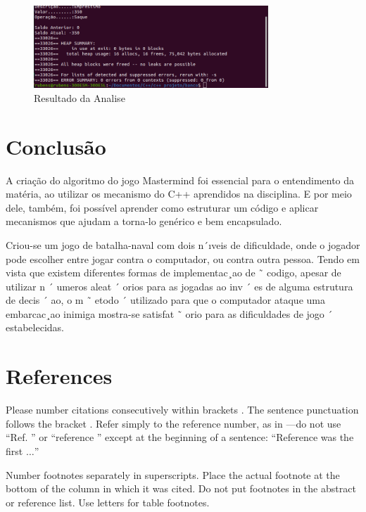 \documentclass[conference]{IEEEtran}
\begin{document}
    \begin{figure}[htbp]
        \centering
        \includegraphics[width=8.8cm]{../img/valgrind2.png}
        \caption{Resultado da Analise}
        \label{fig_valgrind2}
    \end{figure}



\section{Conclusão}

A criação do algoritmo do jogo Mastermind foi essencial
para o entendimento da matéria, ao utilizar os mecanismo do
C++ aprendidos na disciplina. E por meio dele, também, foi
possível aprender como estruturar um código e aplicar
mecanismos que ajudam a torna-lo genérico e bem
encapsulado.

Criou-se um jogo de batalha-naval com dois n´ıveis de dificuldade, onde o jogador pode escolher entre jogar
contra o computador, ou contra outra pessoa. Tendo em vista que existem diferentes formas de implementac¸ao de ˜
codigo, apesar de utilizar n ´ umeros aleat ´ orios para as jogadas ao inv ´ es de alguma estrutura de decis ´ ao, o m ˜ etodo ´
utilizado para que o computador ataque uma embarcac¸ao inimiga mostra-se satisfat ˜ orio para as dificuldades de jogo ´
estabelecidas.

\section*{References}

Please number citations consecutively within brackets \cite{b1}. The 
sentence punctuation follows the bracket \cite{b2}. Refer simply to the reference 
number, as in \cite{b3}---do not use ``Ref. \cite{b3}'' or ``reference \cite{b3}'' except at 
the beginning of a sentence: ``Reference \cite{b3} was the first $\ldots$''

Number footnotes separately in superscripts. Place the actual footnote at 
the bottom of the column in which it was cited. Do not put footnotes in the 
abstract or reference list. Use letters for table footnotes.
\end{document}
